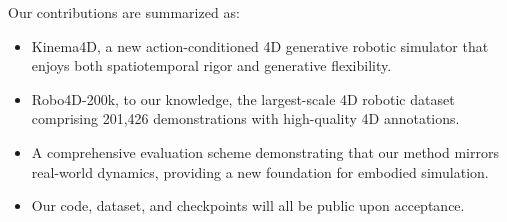 Our contributions are summarized as:
\begin{itemize}
[itemsep=2pt,topsep=2pt,parsep=0pt, leftmargin=2em]
    \item Kinema4D, a new action-conditioned 4D generative robotic simulator that enjoys both spatiotemporal rigor and generative flexibility.
    \item Robo4D-200k, to our knowledge, the largest-scale 4D robotic dataset comprising 201,426 demonstrations with high-quality 4D annotations. %
    \item A comprehensive evaluation scheme demonstrating that our method mirrors real-world dynamics, providing a new foundation for embodied simulation. 
    \item Our code, dataset, and checkpoints will all be public upon acceptance.
\end{itemize}

